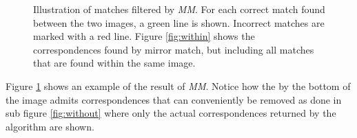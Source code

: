 \documentclass[12pt,journal,compsoc]{IEEEtran}
\begin{document}
\begin{figure}
	\caption{Illustration of matches filtered by \emph{MM}. For each 
	correct match found between the two images, a green line is shown.  
Incorrect matches are marked with a red line. Figure \ref{fig:within} 
shows the correspondences found by mirror match, but including all 
matches that are found within the same image. }
	\label{fig:comparemirror}
\end{figure}
%
Figure \ref{fig:comparemirror} shows an example of the result of 
\emph{MM}. Notice how the by the bottom of the image admits 
correspondences that can conveniently be removed as done in sub figure 
\ref{fig:without} where only the actual correspondences returned by the 
algorithm are shown.
%
\end{document}
